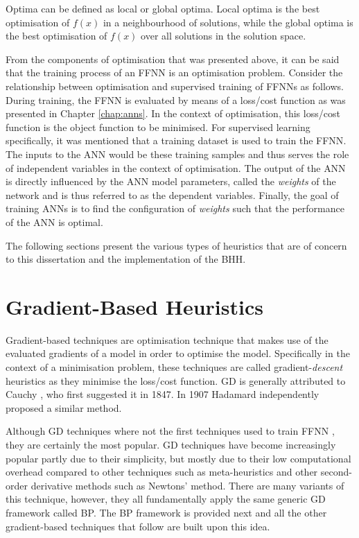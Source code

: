 Optima can be defined as local or global optima. Local optima is the best optimisation of $f(x)$ in a neighbourhood of solutions, while the global optima is the best optimisation of $f(x)$ over all solutions in the solution space.

From the components of optimisation that was presented above, it can be said that the training process of an \ac{FFNN} is an optimisation problem. Consider the relationship between optimisation and supervised training of \acp{FFNN} as follows. During training, the \ac{FFNN} is evaluated by means of a loss/cost function as was presented in Chapter \ref{chap:anns}. In the context of optimisation, this loss/cost function is the object function to be minimised. For supervised learning specifically, it was mentioned that a training dataset is used to train the \ac{FFNN}. The inputs to the \ac{ANN} would be these training samples and thus serves the role of independent variables in the context of optimisation. The output of the \ac{ANN} is directly influenced by the \ac{ANN} model parameters, called the \textit{weights} of the network and is thus referred to as the dependent variables. Finally, the goal of training \acp{ANN} is to find the configuration of \textit{weights} such that the performance of the \ac{ANN} is optimal. 

The following sections present the various types of heuristics that are of concern to this dissertation and the implementation of the \ac{BHH}.



\section{Gradient-Based Heuristics}
\label{sec:heuristics:gd}


Gradient-based techniques are optimisation technique that makes use of the evaluated gradients of a model in order to optimise the model. Specifically in the context of a minimisation problem, these techniques are called gradient-\textit{descent} heuristics as they minimise the loss/cost function. \Ac{GD} is generally attributed to Cauchy \cite{ref:lemarechal:2012}, who first suggested it in 1847. In 1907 Hadamard \cite{ref:hadamard:1908} independently proposed a similar method. 

Although \ac{GD} techniques where not the first techniques used to train \ac{FFNN} 
\cite{ref:engelbrecht:2007}, they are certainly the most popular. \Ac{GD} techniques have become increasingly popular partly due to their simplicity, but mostly due to their low computational overhead compared to other techniques such as meta-heuristics and other second-order derivative methods such as Newtons' method. There are many variants of this technique, however, they all fundamentally apply the same generic \ac{GD} framework called \acl{BP}. The \ac{BP} framework is provided next and all the other gradient-based techniques that follow are built upon this idea.

